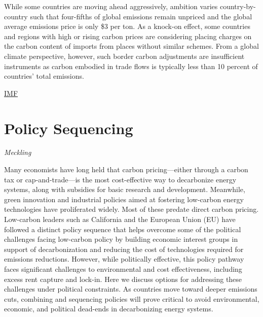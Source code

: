 \documentclass[
]{book}
\begin{document}
While some countries are moving ahead aggressively, ambition varies country-by-country such that four-fifths of global emissions remain unpriced and the global average emissions price is only \$3 per ton. As a knock-on effect, some countries and regions with high or rising carbon prices are considering placing charges on the carbon content of imports from places without similar schemes. From a global climate perspective, however, such border carbon adjustments are insufficient instruments as carbon embodied in trade flows is typically less than 10 percent of countries' total emissions.

\href{https://blogs.imf.org/2021/06/18/a-proposal-to-scale-up-global-carbon-pricing/}{IMF}

\hypertarget{policy-sequencing}{%
\section{Policy Sequencing}\label{policy-sequencing}}

\emph{Meckling}

Many economists have long held that carbon pricing---either through a carbon tax or cap-and-trade---is the most cost-effective way to decarbonize energy systems, along with subsidies for basic research and development. Meanwhile, green innovation and industrial policies aimed at fostering low-carbon energy technologies have proliferated widely. Most of these predate direct carbon pricing. Low-carbon leaders such as California and the European Union (EU) have followed a distinct policy sequence that helps overcome some of the political challenges facing low-carbon policy by building economic interest groups in support of decarbonization and reducing the cost of technologies required for emissions reductions. However, while politically effective, this policy pathway faces significant challenges to environmental and cost effectiveness, including excess rent capture and lock-in. Here we discuss options for addressing these challenges under political constraints. As countries move toward deeper emissions cuts, combining and sequencing policies will prove critical to avoid environmental, economic, and political dead-ends in decarbonizing energy systems.
\end{document}
